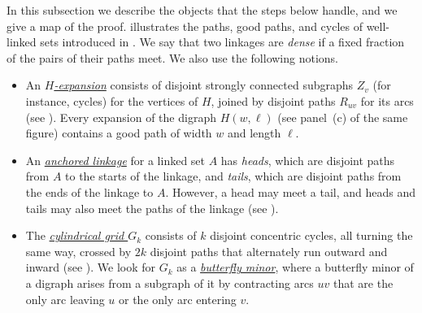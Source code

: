 \documentclass[fontsize=12pt,leading=14pt]{fullpaper}
\newcommand{\Hwl}{H(w,\ell)}
\newcounter{step}
\begin{document}
In this subsection we describe the objects that the steps below handle, and we give a map of the proof.
 illustrates the paths, good paths, and cycles of well-linked sets introduced in .
We say that two linkages are \emph{dense} if a fixed fraction of the pairs of their paths meet.
We also use the following notions.
\begin{itemize}[nosep,leftmargin=*]
  \item An \hyperref[def:expansion]{\emph{$H$-expansion}} consists of disjoint strongly connected subgraphs $Z_v$ (for instance, cycles) for the vertices of $H$, joined by disjoint paths $R_{uv}$ for its arcs (see ).
    Every expansion of the digraph \hyperref[def:Hwl]{$\Hwl$} (see panel~(c) of the same figure) contains a good path of width $w$ and length $\ell$.
  \item An \hyperref[def:anchored]{\emph{anchored linkage}} for a linked set $A$ has \emph{heads}, which are disjoint paths from $A$ to the starts of the linkage, and \emph{tails}, which are disjoint paths from the ends of the linkage to $A$.
    However, a head may meet a tail, and heads and tails may also meet the paths of the linkage (see ).
  \item The \hyperref[def:cyl-grid]{\emph{cylindrical grid $G_k$}} consists of $k$ disjoint concentric cycles, all turning the same way, crossed by $2k$ disjoint paths that alternately run outward and inward (see ).
    We look for $G_k$ as a \hyperref[def:butterfly]{\emph{butterfly minor}}, where a butterfly minor of a digraph arises from a subgraph of it by contracting arcs $uv$ that are the only arc leaving $u$ or the only arc entering $v$.
\end{itemize}
\end{document}
